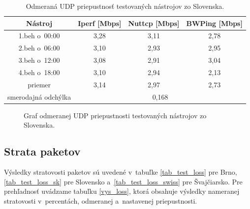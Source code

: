     \begin{table}[h!]
        \begin{center}
            \begin{tabular}{|c|c|c|c|}
                \hline
                Nástroj & Iperf [Mbps]&
                    Nuttcp [Mbps] & BWPing [Mbps] \\ 
                \hline
                1.beh o~00:00 & 3,28 & 3,11 & 2,78 \\
                \hline
                2.beh o~06:00 & 3,10 & 2,93 & 2,95 \\
                \hline
                3.beh o~12:00 & 3,08 & 2,91 & 3,04 \\
                \hline
                4.beh o~18:00 & 3,10 & 2,94 & 2,13 \\
                \hline
                priemer       & 3,14 & 2,97 & 2,73 \\
                \hline
                smerodajná odchýlka & \multicolumn{3}{c|}{0,168}\\
                \hline
            \end{tabular}
            \caption{Odmeraná UDP priepustnosť testovaných nástrojov zo
                Slovenska.} 
            \label{tab_test_udp_sk}
        \end{center}
    \end{table}
   \begin{figure}[H]
       \begin{center}
               \caption{Graf odmeranej UDP priepustnosti testovaných nástrojov
               zo Slovenska.}
           \label{tab_test_udp_sk_graf}
       \end{center}
   \end{figure}

   \newpage
        \subsection{Strata paketov} \label{test_vys_strata}
        Výsledky stratovosti paketov sú uvedené v~tabuľke \ref{tab_test_loss}
        pre Brno, \ref{tab_test_loss_sk} pre Slovensko
        a~\ref{tab_test_loss_swiss} pre Švajčiarsko. Pre prehľadnosť uvádzame
        tabuľku \ref{vys_loss}, ktorá obsahuje výsledky nameranej stratovosti
        v~percentách, odmeranej a~nastavenej priepustnosti.


